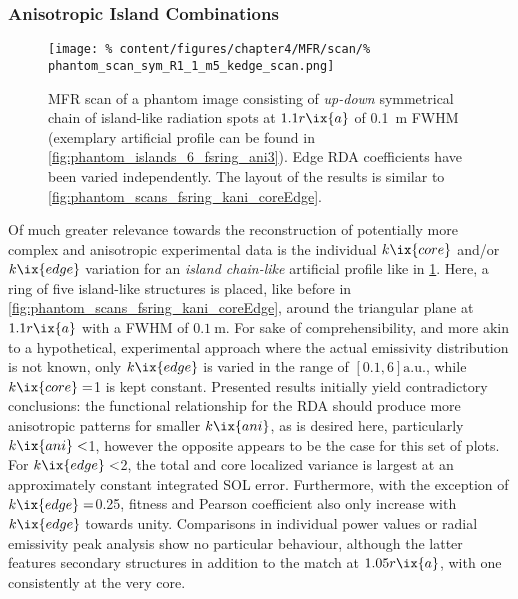             \subsubsection*{Anisotropic Island Combinations}%
%
            \begin{figure}[t]%
                    \centering%
                    \captionsetup{width=.37\textwidth}%
                    \begin{minipage}[c]{0.37\textwidth}%
                        \centering%
                        \caption{%
                           MFR scan of a phantom image consisting of \textit{up-down} symmetrical chain of island-like radiation spots at $1.1r\ix{a}$ of \SI{0.1}{\meter} FWHM (exemplary artificial profile can be found in \cref{fig:phantom_islands_6_fsring_ani3}). Edge RDA coefficients have been varied independently. The layout of the results is similar to \cref{fig:phantom_scans_fsring_kani_coreEdge}.}\label{fig:phantom_scans_sym5_kani_edge}%
                    \end{minipage}%
                    \hfill%
                    \begin{minipage}[c]{0.53\textwidth}%
                        \centering%
                        \texttt{[image: \%
                            content/figures/chapter4/MFR/scan/\%
                            phantom\_scan\_sym\_R1\_1\_m5\_kedge\_scan.png]}%
                    \end{minipage}%
                \end{figure}%
%
                Of much greater relevance towards the reconstruction of potentially more complex and anisotropic experimental data is the individual $k\ix{core}$ and/or $k\ix{edge}$ variation for an \textit{island chain-like} artificial profile like in \cref{fig:phantom_scans_sym5_kani_edge}. Here, a ring of five island-like structures is placed, like before in \cref{fig:phantom_scans_fsring_kani_coreEdge}, around the triangular plane at $1.1r\ix{a}$ with a FWHM of $\SI{0.1}{\meter}$. For sake of comprehensibility, and more akin to a hypothetical, experimental approach where the actual emissivity distribution is not known, only $k\ix{edge}$ is varied in the range of $\left[0.1, 6\right]\text{a.u.}$, while $k\ix{core}=$\SI{1}{\arbitraryunit} is kept constant. Presented results initially yield contradictory conclusions: the functional relationship for the RDA should produce more anisotropic patterns for smaller $k\ix{ani}$, as is desired here, particularly $k\ix{ani}<$\SI{1}{\arbitraryunit}, however the opposite appears to be the case for this set of plots. For $k\ix{edge}<$\SI{2}{\arbitraryunit}, the total and core localized variance is largest at an approximately constant integrated SOL error. Furthermore, with the exception of $k\ix{edge}=$\SI{0.25}{\arbitraryunit}, fitness and Pearson coefficient also only increase with $k\ix{edge}$ towards unity. Comparisons in individual power values or radial emissivity peak analysis show no particular behaviour, although the latter features secondary structures in addition to the match at $1.05r\ix{a}$, with one consistently at the very core.\\%
